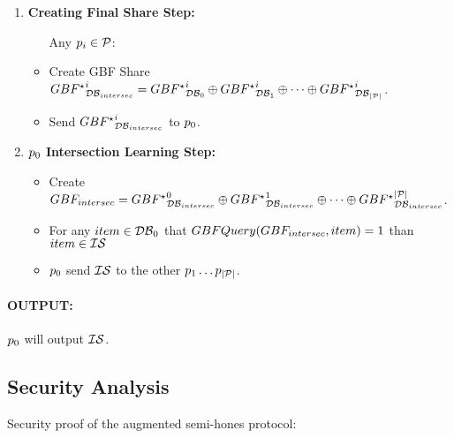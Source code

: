 {\begin{enumerate}
\item{
{\bf Creating Final Share Step:}
\begin{itemize}
\item[Any $p_{i} \in \mathcal{P}$:]
\item{Create GBF Share ${GBF^\star}_{\mathcal{DB}_{intersec}}^{i} = {GBF^\star}_{\mathcal{DB}_{0}}^{i} \oplus {GBF^\star}_{\mathcal{DB}_{1}}^{i} \oplus \dots \oplus {GBF^\star}_{\mathcal{DB}_{| \mathcal{P} |}}^{i}$.}
\item{Send ${GBF^\star}_{\mathcal{DB}_{intersec}}^{i}$ to $p_{0}$.}
\end{itemize}
}

\item{
{\bf $p_{0}$ Intersection Learning Step:}
\begin{itemize}
\item{Create $GBF_{intersec} = {GBF^\star}_{\mathcal{DB}_{intersec}}^{0} \oplus {GBF^\star}_{\mathcal{DB}_{intersec}}^{1} \oplus \dots \oplus {GBF^\star}_{\mathcal{DB}_{intersec}}^{| \mathcal{P} |}$.}
\item{For any $item \in \mathcal{DB}_{0}$ that $GBFQuery(GBF_{intersec},item) = 1$ than $item \in \mathcal{IS}$}
\item{$p_{0}$ send $\mathcal{IS}$ to the other $p_{1}\dots p_{| \mathcal{P} |}$.}
\end{itemize}
}




\end{enumerate}

\paragraph{\bf{OUTPUT:}} $p_{0}$ will output $\mathcal{IS}$.
}

\subsection{Security Analysis}
\iffalse	%
Security proof of the augmented semi-hones protocol:

